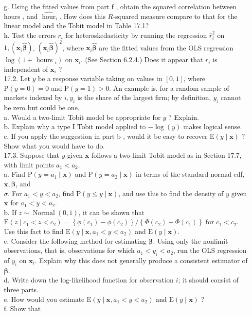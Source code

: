 \documentclass[10pt]{article}
\begin{document}
g. Using the fitted values from part f , obtain the squared correlation between hours ${ }_{i}$ and $\widehat{\operatorname{hour}}_{i}$. How does this $R$-squared measure compare to that for the linear model and the Tobit model in Table 17.1?\\
h. Test the errors $r_{i}$ for heteroskedasticity by running the regression $\hat{r}_{i}^{2}$ on $1,\left(\mathbf{x}_{i} \hat{\boldsymbol{\beta}}\right)$, $\left(\mathbf{x}_{i} \hat{\boldsymbol{\beta}}\right)^{2}$, where $\mathbf{x}_{i} \hat{\boldsymbol{\beta}}$ are the fitted values from the OLS regression $\log \left(1+\right.$ hours $\left._{i}\right)$ on $\mathbf{x}_{i}$. (See Section 6.2.4.) Does it appear that $r_{i}$ is independent of $\mathbf{x}_{i}$ ?\\
17.2. Let $y$ be a response variable taking on values in $[0,1]$, where $\mathrm{P}(y=0)=0$ and $\mathrm{P}(y=1)>0$. An example is, for a random sample of markets indexed by $i, y_{i}$ is the share of the largest firm; by definition, $y_{i}$ cannot be zero but could be one.\\
a. Would a two-limit Tobit model be appropriate for $y$ ? Explain.\\
b. Explain why a type I Tobit model applied to $-\log (y)$ makes logical sense.\\
c. If you apply the suggestion in part b , would it be easy to recover $\mathrm{E}(y \mid \mathbf{x})$ ? Show what you would have to do.\\
17.3. Suppose that $y$ given $\mathbf{x}$ follows a two-limit Tobit model as in Section 17.7, with limit points $a_{1}<a_{2}$.\\
a. Find $\mathrm{P}\left(y=a_{1} \mid \mathbf{x}\right)$ and $\mathrm{P}\left(y=a_{2} \mid \mathbf{x}\right)$ in terms of the standard normal cdf, $\mathbf{x}, \boldsymbol{\beta}$, and\\
$\sigma$. For $a_{1}<y<a_{2}$, find $\mathrm{P}(y \leq y \mid \mathbf{x})$, and use this to find the density of $y$ given $\mathbf{x}$ for $a_{1}<y<a_{2}$.\\
b. If $z \sim \operatorname{Normal}(0,1)$, it can be shown that $\mathrm{E}\left(z \mid c_{1}<z<c_{2}\right)=\left\{\phi\left(c_{1}\right)-\phi\left(c_{2}\right)\right\} / \left\{\Phi\left(c_{2}\right)-\Phi\left(c_{1}\right)\right\}$ for $c_{1}<c_{2}$. Use this fact to find $\mathrm{E}\left(y \mid \mathbf{x}, a_{1}<y<a_{2}\right)$ and $\mathrm{E}(y \mid \mathbf{x})$.\\
c. Consider the following method for estimating $\boldsymbol{\beta}$. Using only the nonlimit observations, that is, observations for which $a_{1}<y_{i}<a_{2}$, run the OLS regression of $y_{i}$ on $\mathbf{x}_{i}$. Explain why this does not generally produce a consistent estimator of $\boldsymbol{\beta}$.\\
d. Write down the log-likelihood function for observation $i$; it should consist of three parts.\\
e. How would you estimate $\mathrm{E}\left(y \mid \mathbf{x}, a_{1}<y<a_{2}\right)$ and $\mathrm{E}(y \mid \mathbf{x})$ ?\\
f. Show that
\end{document}
